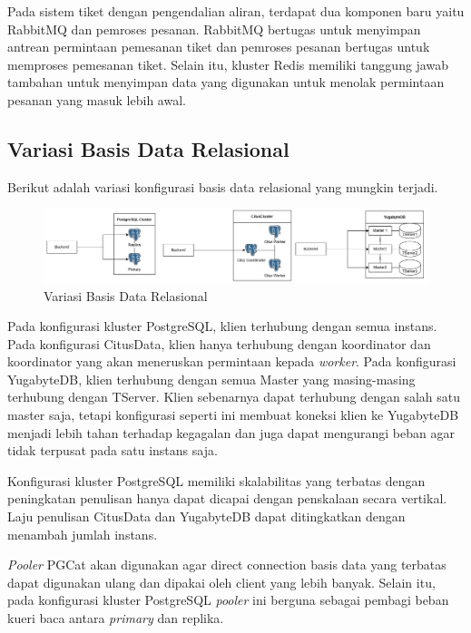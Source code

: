 Pada sistem tiket dengan pengendalian aliran, terdapat dua komponen baru yaitu RabbitMQ dan pemroses pesanan. RabbitMQ bertugas untuk menyimpan antrean permintaan pemesanan tiket dan pemroses pesanan bertugas untuk memproses pemesanan tiket. Selain itu, kluster Redis memiliki tanggung jawab tambahan untuk menyimpan data yang digunakan untuk menolak permintaan pesanan yang masuk lebih awal.

\subsection{Variasi Basis Data Relasional}

Berikut adalah variasi konfigurasi basis data relasional yang mungkin terjadi.

\begin{figure}[htbp]
    \centering
    \includegraphics[width=1\textwidth]{resources/chapter-3/rdbms.png}
    \caption{Variasi Basis Data Relasional}
    \label{fig:rdbms-variation}
\end{figure}

Pada konfigurasi kluster PostgreSQL, klien terhubung dengan semua instans. Pada konfigurasi CitusData, klien hanya terhubung dengan koordinator dan koordinator yang akan meneruskan permintaan kepada \textit{worker}. Pada konfigurasi YugabyteDB, klien terhubung dengan semua Master yang masing-masing terhubung dengan TServer. Klien sebenarnya dapat terhubung dengan salah satu master saja, tetapi konfigurasi seperti ini membuat koneksi klien ke YugabyteDB menjadi lebih tahan terhadap kegagalan dan juga dapat mengurangi beban agar tidak terpusat pada satu instans saja.

Konfigurasi kluster PostgreSQL memiliki skalabilitas yang terbatas dengan peningkatan penulisan hanya dapat dicapai dengan penskalaan secara vertikal. Laju penulisan CitusData dan YugabyteDB dapat ditingkatkan dengan menambah jumlah instans.

\textit{Pooler} PGCat akan digunakan agar direct connection basis data yang terbatas dapat digunakan ulang dan dipakai oleh client yang lebih banyak. Selain itu, pada konfigurasi kluster PostgreSQL \textit{pooler} ini berguna sebagai pembagi beban kueri baca antara \textit{primary} dan replika.

